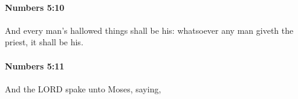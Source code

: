 		\paragraph{Numbers 5:10} %
			\label{NUMBERS-5-10}

			And every man’s hallowed things shall be his: whatsoever any man giveth the priest, it shall be his.


		\paragraph{Numbers 5:11} %
			\label{NUMBERS-5-11}

			And the LORD spake unto Moses, saying,


